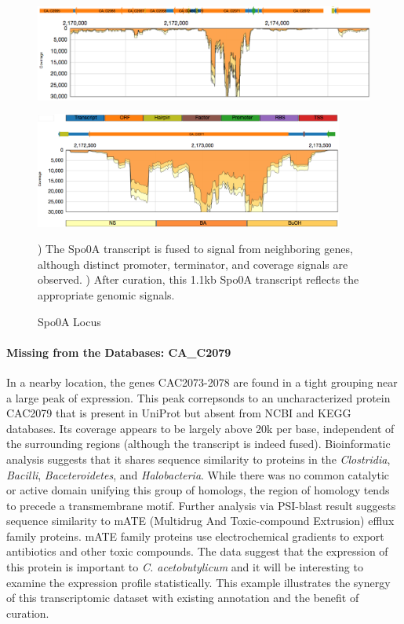 \begin{figure}
\small
{\includegraphics[width=\textwidth,height=1.5in]{images/Assembly/Examples/Spo0A/Spo0A-locus.png}
\label{fig:10a}}
{\includegraphics[width=\textwidth,height=1.5in]{images/Assembly/Examples/Spo0A/Spo0A-curated.png}
\label{fig:10b}}
\caption{Spo0A Locus}
) The Spo0A transcript is fused to signal from neighboring genes, although distinct promoter, terminator, and coverage signals are observed. ) After curation, this 1.1kb Spo0A transcript reflects the appropriate genomic signals.
\end{figure}


\paragraph{Missing from the Databases: CA_C2079}

In a nearby location, the genes CAC2073-2078 are found in a tight grouping near a large peak of expression. This peak correpsonds to an uncharacterized protein CAC2079 that is present in UniProt but absent from NCBI and KEGG databases. Its coverage appears to be largely above 20k per base, independent of the surrounding regions (although the transcript is indeed fused). Bioinformatic analysis suggests that it shares sequence similarity to proteins in the \textit{Clostridia}, \textit{Bacilli}, \textit{Baceteroidetes}, and \textit{Halobacteria}. While there was no common catalytic or active domain unifying this group of homologs, the region of homology tends to precede a transmembrane motif. Further analysis via PSI-blast result suggests sequence similarity to mATE (Multidrug And Toxic-compound Extrusion) efflux family proteins. mATE family proteins use electrochemical gradients to export antibiotics and other toxic compounds. The data suggest that the expression of this protein is important to \textit{C. acetobutylicum} and it will be interesting to examine the expression profile statistically. This example illustrates the synergy of this transcriptomic dataset with existing annotation and the benefit of curation. 

